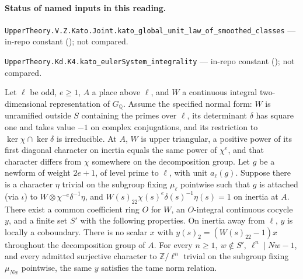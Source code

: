 

\paragraph{Status of named inputs in this reading.}
\noindent\nolinkurl{UpperTheory.V.Z.Kato.Joint.kato_global_unit_law_of_smoothed_classes} --- in-repo constant (); not compared.\par
\noindent\nolinkurl{UpperTheory.Kd.K4.kato_eulerSystem_integrality} --- in-repo constant (); not compared.\par

\begin{formalstatement}\label{pn:P026}
Let \(\ell\) be odd, \(e\ge1\), \(A\) a place above \(\ell\), and \(W\)
a continuous integral two-dimensional representation of \(G_{\mathbb Q}\).
Assume the specified normal form: \(W\) is unramified outside \(S\)
containing the primes over \(\ell\), its determinant \(\delta\) has
square one and takes value \(-1\) on complex conjugations, and its
restriction to \(\ker\chi\cap\ker\delta\) is irreducible. At \(A\),
\(W\) is upper triangular,
a positive power of its first diagonal character on inertia equals the
same power of \(\chi^e\), and that character differs from \(\chi\)
somewhere on the decomposition group. Let \(g\) be a newform of weight
\(2e+1\), of level prime to \(\ell\), with unit \(a_\ell(g)\).
Suppose there is a character \(\eta\) trivial on the subgroup fixing
\(\mu_\ell\) pointwise such that \(g\) is attached (via \(\iota\))
to \(W\otimes\chi^{-e}\delta^{-1}\eta\), and
\(W(s)_{22}\chi(s)^e\delta(s)^{-1}\eta(s)=1\) on inertia at \(A\).
There exist a common coefficient ring \(O\) for \(W\), an \(O\)-integral
continuous cocycle \(y\), and a finite set \(S'\) with the following properties.
On inertia away from \(\ell\), \(y\) is locally a coboundary.
There is no scalar \(x\) with \(y(s)_2=(W(s)_{22}-1)x\) throughout
the decomposition group of \(A\).
For every \(n\ge1,\ w\notin S',\ \ell^n\mid Nw-1\), and every admitted
surjective character to \(\mathbb Z/\ell^n\) trivial on the subgroup
fixing \(\mu_{Nw}\) pointwise, the same \(y\) satisfies the tame norm relation.
\end{formalstatement}

